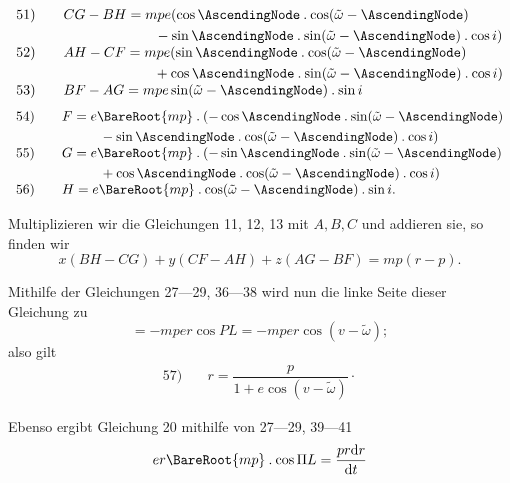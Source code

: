 \[
\begin{array}{rl}
51)\quad&\begin{aligned}[t]CG-BH&=mpe(\cos\AscendingNode\mathbin{.}\cos(\tilde\omega-\AscendingNode)\\&\qquad-\sin\AscendingNode\mathbin{.}\sin(\tilde\omega-\AscendingNode)\mathbin{.}\cos i)\end{aligned}\\[5pt]
52)\quad&\begin{aligned}[t]AH-CF&=mpe(\sin\AscendingNode\mathbin{.}\cos(\tilde\omega-\AscendingNode)\\&\qquad+\cos\AscendingNode\mathbin{.}\sin(\tilde\omega-\AscendingNode)\mathbin{.}\cos i)\end{aligned}\\[5pt]
53)\quad&BF-AG=mpe\sin(\tilde\omega-\AscendingNode)\mathbin{.}\sin i
\end{array}
\]
\[
\begin{array}{rl}
54)\quad&\begin{aligned}[t]F&=e\BareRoot{mp}\mathbin{.}(-\cos\AscendingNode\mathbin{.}\sin(\tilde\omega-\AscendingNode)\\&\qquad-\sin\AscendingNode\mathbin{.}\cos(\tilde\omega-\AscendingNode)\mathbin{.}\cos i)\end{aligned}\\[5pt]
55)\quad&\begin{aligned}[t]G&=e\BareRoot{mp}\mathbin{.}(-\sin\AscendingNode\mathbin{.}\sin(\tilde\omega-\AscendingNode)\\&\qquad+\cos\AscendingNode\mathbin{.}\cos(\tilde\omega-\AscendingNode)\mathbin{.}\cos i)\end{aligned}\\[5pt]
56)\quad&H=e\BareRoot{mp}\mathbin{.}\cos(\tilde\omega-\AscendingNode)\mathbin{.}\sin i.
\end{array}
\]
\par Multiplizieren wir die Gleichungen 11, 12, 13 mit \(A,B,C\) und addieren sie, so finden wir
\[
x(BH-CG)+y(CF-AH)+z(AG-BF)=mp(r-p).
\]
\par Mithilfe der Gleichungen 27—29, 36—38 wird nun die linke Seite dieser Gleichung zu
\[
=-mper\cos PL=-mper\cos(v-\tilde\omega);
\]
also gilt
\[
\begin{array}{rl}57)\quad&r=\dfrac{p}{1+e\cos(v-\tilde\omega)}\mathpunct{\cdot}\end{array}
\]
\par Ebenso ergibt Gleichung 20 mithilfe von 27—29, 39—41
\[
er\BareRoot{mp}\mathbin{.}\cos\Pi L=\dfrac{pr\mathrm{d}r}{\mathrm{d}t}
\]
